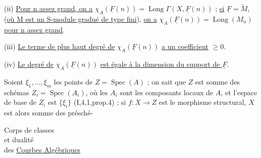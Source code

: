 (ii) \uline{Pour n assez grand, on a} $\chi_A(\underline F(n))=\operatorname{Long}\Gamma(X,\underline F(n))$ ; \uline{si} $\underline F=\widetilde M$,  (\uline{où M est un S-module gradué de type fini}), \uline{on a} $\chi_A(\underline F(n))=\operatorname{Long}(M_n)$ \uline{pour n assez grand}.

(iii) \uline{Le terme de plus haut degré de} $\chi_A(\underline F(n))$ \uline{a un coefficient} $\geq0$.
\margin{$>$}

(iv) \uline{Le degré de} $\chi_A(\underline F(n))$ \uline{est égale à la dimension du support de $\underline F$}.

Soient  $\xi_1,\ldots,\xi_m$ les points de $Z=\operatorname{Spec}(A)$ ; on sait que  $Z$ est somme des schémas $Z_i=\operatorname{Spec}(A_i)$,  où  les $A_i$ sont les composants locaux de $A$, et l'espace de base de $Z_i$ est $\{\xi_i\}$ (I,4,1,prop.4) ; si $f:X\to Z$ est le morphisme structural, $X$ est alors somme des présché-

\begin{flushright}
Corps de classes\\
et dualité\\
des \uline{Courbes Algébriques}
\end{flushright}

